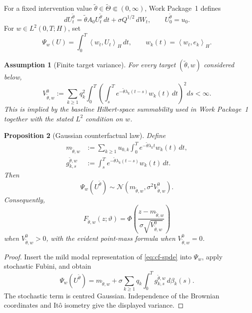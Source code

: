 \documentclass[11pt]{article}
\newtheorem{assumption}{Assumption}[section]
\newtheorem{proposition}[assumption]{Proposition}
\theoremstyle{remark}
\newcommand{\ip}[2]{\left\langle #1,#2\right\rangle_H}
\newcommand{\ThetaI}{\widetilde\Theta}
\newcommand{\PhiN}{\Phi}
\newcommand{\1}{\mathbf 1}
\begin{document}
For a fixed intervention value $\widetilde\theta\in\ThetaI\Subset(0,\infty)$, Work Package~1 defines
\begin{equation}\label{eq:cf-spde}
 dU_t^{\widetilde\theta}
 =\widetilde\theta A_0U_t^{\widetilde\theta}\,dt
 +\sigma Q^{1/2}\,dW_t,
 \qquad U_0^{\widetilde\theta}=u_0.
\end{equation}
For $w\in L^2(0,T;H)$, set
\[
 \Psi_w(U)=\int_0^T\ip{w_t}{U_t}\,dt,
 \qquad w_k(t)=\ip{w_t}{e_k}.
\]

\begin{assumption}[Finite target variance]\label{ass:target}
For every target $(\widetilde\theta,w)$ considered below,
\[
 V_{\widetilde\theta,w}^0
 :=\sum_{k\ge1}q_k^2\int_0^T
 \left(\int_s^T e^{-\widetilde\theta\lambda_k(t-s)}w_k(t)\,dt\right)^2ds
 <\infty.
\]
This is implied by the baseline Hilbert-space summability used in Work Package~1 together with the stated $L^2$ condition on $w$.
\end{assumption}

\begin{proposition}[Gaussian counterfactual law]\label{prop:gaussian-target}
Define
\begin{align}
 m_{\widetilde\theta,w}
 &:=\sum_{k\ge1}u_{0,k}\int_0^T
 e^{-\widetilde\theta\lambda_kt}w_k(t)\,dt,\label{eq:target-mean}\\
 g_{k,s}^{\widetilde\theta,w}
 &:=\int_s^T e^{-\widetilde\theta\lambda_k(t-s)}w_k(t)\,dt.\label{eq:gks}
\end{align}
Then
\begin{equation}\label{eq:target-law}
 \Psi_w(U^{\widetilde\theta})
 \sim\mathcal N\left(
 m_{\widetilde\theta,w},
 \sigma^2V_{\widetilde\theta,w}^0
 \right).
\end{equation}
Consequently,
\begin{equation}\label{eq:target-cdf}
 F_{\widetilde\theta,w}(z;\vartheta)
 =\PhiN\left(
 \frac{z-m_{\widetilde\theta,w}}
 {\sigma\sqrt{V_{\widetilde\theta,w}^0}}
 \right)
\end{equation}
when $V_{\widetilde\theta,w}^0>0$, with the evident point-mass formula when $V_{\widetilde\theta,w}^0=0$.
\end{proposition}

\begin{proof}
Insert the mild modal representation of \eqref{eq:cf-spde} into $\Psi_w$, apply stochastic Fubini, and obtain
\[
 \Psi_w(U^{\widetilde\theta})
 =m_{\widetilde\theta,w}
 +\sigma\sum_{k\ge1}q_k\int_0^T
 g_{k,s}^{\widetilde\theta,w}\,d\beta_k(s).
\]
The stochastic term is centred Gaussian.  Independence of the Brownian coordinates and It\^o isometry give the displayed variance.
\end{proof}
\end{document}
